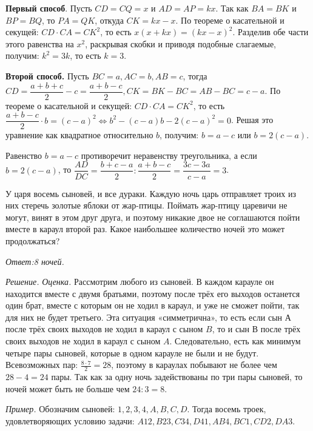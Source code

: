 \textbf{Первый способ}. 
Пусть $C D=C Q=x$ и $A D=A P= kx$. Так как $B A=B K$ и $B P=B Q$, то $P A=Q K$, откуда $C K =k x-x$. По теореме о касательной и секущей: $CD\cdot CA =C K^2$, то есть $x(x+k x)=(k x-x)^2$. Разделив обе части этого равенства на $x^2$, раскрывая скобки и приводя подобные слагаемые, получим: $k^2=3 k$, то есть $k=3$.

\textbf{Второй способ.}
Пусть $B C=a, A C=b, A B=c$, тогда $C D=\dfrac{a+b+c}{2}-c=\dfrac{a+b-c}{2}, C K= B K-B C=A B-B C=c-a$. По теореме о касательной и секущей: $C D \cdot C A=C K^2$, то есть $\dfrac{a+b-c}{2} \cdot b=(c-a)^2 \Leftrightarrow b^2-(c-a) b-2(c-a)^2=0$. Решая это уравнение как квадратное относительно $b$, получим: $b=a-c$ или $b=2(c-a)$.

Равенство $b=a-c$ противоречит неравенству треугольника, а если $b=2(c-a)$, то $\dfrac{A D}{D C}=\dfrac{b+c-a}{2}: \dfrac{a+b-c}{2}=\dfrac{3 c-3 a}{c-a}=3$.


У царя восемь сыновей, и все дураки. Каждую ночь царь отправляет троих из них стеречь золотые яблоки от жар-птицы. Поймать жар-птицу царевичи не могут, винят в этом друг друга, и поэтому никакие двое не соглашаются пойти вместе в караул второй раз. Какое наибольшее количество ночей это может продолжаться?


\textit{Ответ:8 ночей.}

\textit{Решение.}
\textit{Оценка.} Рассмотрим любого из сыновей. В каждом карауле он находится вместе с двумя братьями, поэтому после трёх его выходов останется один брат, вместе с которым он не ходил в караул, и уже не сможет пойти, так для них не будет третьего. Эта ситуация «симметрична», то есть если сын А после трёх своих выходов не ходил в караул с сыном $B$, то и сын В после трёх своих выходов не ходил в караул с сыном $A$. Следовательно, есть как минимум четыре пары сыновей, которые в одном карауле не были и не будут. Всевозможных пар: $\frac{8 \cdot 7}{2}=28$, поэтому в караулах побывают не более чем $28-4=24$ пары. Так как за одну ночь задействованы по три пары сыновей, то ночей может быть не больше чем $24: 3=8$.

\textit{Пример.} Обозначим сыновей: $1, 2, 3, 4, A, B, C, D.$ Тогда восемь троек, удовлетворяющих условию задачи: $A12, B23, C34, D41, AB4, BC1, CD2, DA3.$

